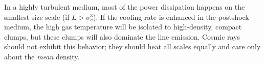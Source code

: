   In a highly turbulent medium, most of the power
dissipation happens on the smallest size scale (if $L > \sigma_v^3$).  If the
cooling rate is enhanced in the postshock medium, the high gas temperature will
be isolated to high-density, compact clumps, but these clumps will also
dominate the line emission.  
Cosmic rays should not exhibit this behavior; they should heat all scales equally
and care only about the \emph{mean} density.

%
%
